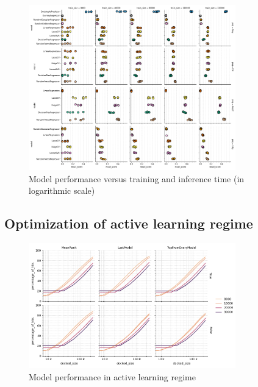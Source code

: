 \begin{figure}[h]
\centering
\includegraphics[width=0.8\textwidth]{figures/Figure_4.png}
\caption{Model performance versus training and inference time (in logarithmic scale)}
\label{fig:fig_4}
\end{figure}

\subsection{Optimization of active learning regime}


\begin{figure}[h]
\centering
\includegraphics[width=0.8\textwidth]{figures/Figure_3_D4.png}
\caption{Model performance in active learning regime}
\label{fig:fig_3}
\end{figure}


